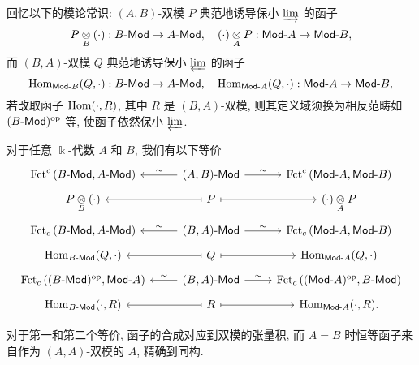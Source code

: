 回忆以下的模论常识: $(A, B)$-双模 $P$ 典范地诱导保小 $\varinjlim$ 的函子
\[ P \underset{B}{\otimes} (\cdot): B\text{-}\mathsf{Mod} \to A\text{-}\mathsf{Mod}, \quad (\cdot) \underset{A}{\otimes} P : \mathsf{Mod}\text{-}A \to \mathsf{Mod}\text{-}B, \]
而 $(B, A)$-双模 $Q$ 典范地诱导保小 $\varprojlim$ 的函子
\[ \operatorname{Hom}_{\mathsf{Mod}\text{-}B}(Q, \cdot): B\text{-}\mathsf{Mod} \to A\text{-}\mathsf{Mod}, \quad \operatorname{Hom}_{\mathsf{Mod}\text{-}A}(Q, \cdot): \mathsf{Mod}\text{-}A \to \mathsf{Mod}\text{-}B, \]
若改取函子 $\operatorname{Hom}(\cdot, R)$, 其中 $R$ 是 $(B, A)$-双模, 则其定义域须换为相反范畴如 $(B\text{-}\mathsf{Mod})^{\operatorname{op}}$ 等, 使函子依然保小 $\varprojlim$.

\begin{theorem}\label{prop:Morita}
	对于任意 $\Bbbk$-代数 $A$ 和 $B$, 我们有以下等价
	\[\begin{tikzcd}[row sep=tiny]
		\mathrm{Fct}^c\left(B\dcate{Mod}, A\dcate{Mod}\right) & (A, B)\dcate{Mod} \arrow[l, "\sim"'] \arrow[r, "\sim"] & \mathrm{Fct}^c\left(\cated{Mod}A, \cated{Mod}B\right) \\
		P \dotimes{B} (\cdot) & P \arrow[mapsto, l] \arrow[mapsto, r] & (\cdot) \dotimes{A} P \\
		\mathrm{Fct}_c\left(B\dcate{Mod}, A\dcate{Mod}\right) & (B, A)\dcate{Mod} \arrow[l, "\sim"'] \arrow[r, "\sim"] & \mathrm{Fct}_c\left(\cated{Mod}A, \cated{Mod}B\right) \\
		\Hom_{B\dcate{Mod}}(Q, \cdot) & Q \arrow[mapsto, l] \arrow[mapsto, r] & \Hom_{\cated{Mod}A}(Q, \cdot) \\
		\mathrm{Fct}_c\left((B\dcate{Mod})^{\opp}, \cated{Mod}A \right) & (B, A)\dcate{Mod} \arrow[l, "\sim"'] \arrow[r, "\sim"] & \mathrm{Fct}_c\left((\cated{Mod}A)^{\opp}, B\dcate{Mod}\right) \\
		\Hom_{B\dcate{Mod}}(\cdot, R) & R \arrow[mapsto, l] \arrow[mapsto, r] & \Hom_{\cated{Mod}A}(\cdot, R).
	\end{tikzcd}\]

	对于第一和第二个等价, 函子的合成对应到双模的张量积, 而 $A=B$ 时恒等函子来自作为 $(A, A)$-双模的 $A$, 精确到同构.
\end{theorem}
